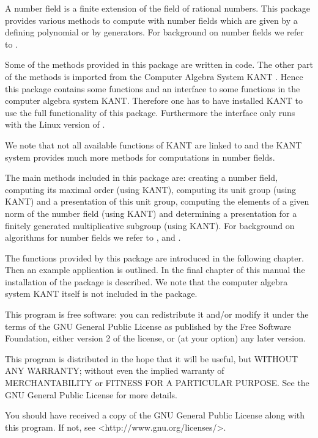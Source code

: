 

A number field is a finite extension of the field of rational numbers. 
This package provides various methods to compute with number fields
which are given by a defining polynomial or by generators. For background 
on number fields we refer to \cite{Sta79}.

Some of the methods provided in this package are written in {\GAP} code.
The other part of the methods is imported from the Computer Algebra 
System KANT \cite{Kant}. Hence this package contains some {\GAP} functions 
and an interface to some functions in the computer algebra system
KANT. Therefore one has to have installed KANT to use the full functionality
of this package. Furthermore the interface only runs with the Linux version of
{\GAP}.

We note that not all available functions of KANT are linked to {\GAP} and
the KANT system provides much more methods for computations in number
fields. 

The main methods included in this package are: creating a number field, 
computing its maximal order (using KANT), computing its unit group (using 
KANT) and a presentation of this unit group, computing the elements of a
given norm of the number field (using KANT) and determining a presentation
for a finitely generated multiplicative subgroup (using KANT). For background
on algorithms for number fields we refer to \cite{Poh93}, \cite{PZa89} and
\cite{Coh93}.

The functions provided by this package are introduced in the following
chapter. Then an example application is outlined. In the final chapter
of this manual the installation of the package is described. We note
that the computer algebra system KANT itself is not included in the package. 


This program is free software: you can redistribute it and/or modify
it under the terms of the GNU General Public License as published by
the Free Software Foundation, either version 2 of the license, or
(at your option) any later version.

This program is distributed in the hope that it will be useful,
but WITHOUT ANY WARRANTY; without even the implied warranty of
MERCHANTABILITY or FITNESS FOR A PARTICULAR PURPOSE.  See the
GNU General Public License for more details.

You should have received a copy of the GNU General Public License
along with this program. If not, see <http://www.gnu.org/licenses/>.

